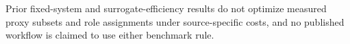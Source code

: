 Prior fixed-system and surrogate-efficiency results do not optimize measured proxy subsets and role assignments under source-specific costs, and no published workflow is claimed to use either benchmark rule.